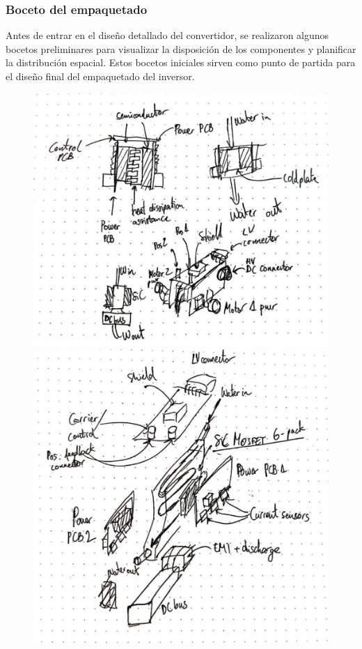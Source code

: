 \subsubsection{Boceto del empaquetado}

Antes de entrar en el diseño detallado del convertidor, se realizaron algunos bocetos preliminares para visualizar la disposición de los componentes y planificar la distribución espacial. Estos bocetos iniciales sirven como punto de partida para el diseño final del empaquetado del inversor.

\begin{figure}[H]
	\centering
	\begin{minipage}{0.45\textwidth}
		\centering
		\includegraphics[width=\textwidth]{fig/boceto1}
	\end{minipage}\hfill
	\begin{minipage}{0.45\textwidth}
		\centering
		\includegraphics[width=\textwidth]{fig/boceto2}

\end{minipage}
\end{figure}
